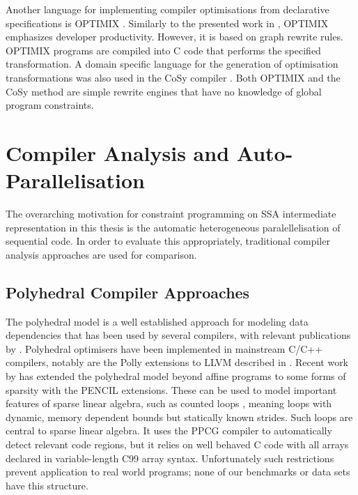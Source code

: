     Another language for implementing compiler optimisations from
    declarative specifications is OPTIMIX \citep{Assmann1996,Assmann98optimix}.
    Similarly to the presented work in , OPTIMIX emphasizes
    developer productivity.
    However, it is based on graph rewrite rules.
    OPTIMIX programs are compiled into C code that performs the specified
    transformation.
    A domain specific language for the generation of optimisation
    transformations was also used in the CoSy compiler \citep{Alt1994}.
    Both OPTIMIX and the CoSy method are simple rewrite engines that have no
    knowledge of global program constraints.

\section{Compiler Analysis and Auto-Parallelisation}

    The overarching motivation for constraint programming on SSA intermediate
    representation in this thesis is the automatic heterogeneous
    paralellelisation of sequential code.
    In order to evaluate this appropriately, traditional compiler analysis
    approaches are used for comparison.

\subsection{Polyhedral Compiler Approaches}

    The polyhedral model is a well established approach for modeling data
    dependencies that has been used by several compilers, with relevant
    publications by \citet{redon1994scheduling, jouvelot1989unified,
    chi1997optimizing, gupta2006simplifying, stock2014framework}.
    Polyhedral optimisers have been implemented in mainstream C/C++ compilers,
    notably are the Polly extensions to LLVM described in
    \cite{Doerfert2015Polly}.
    Recent work by \citet{7429301} has extended the polyhedral model beyond
    affine programs to some forms of sparsity with the PENCIL extensions.
    These can be used to model important features of sparse linear algebra, such
    as counted loops \citep{Zhao:2018:PCF:3178372.3179509}, meaning loops with
    dynamic, memory dependent bounds but statically known strides.
    Such loops are central to sparse linear algebra.
    It uses the PPCG compiler \citep{Verdoolaege:2013:PPC:2400682.2400713} to
    automatically detect relevant code regions, but it relies on well behaved C
    code with all arrays declared in variable-length C99 array syntax.
    Unfortunately such restrictions prevent application to real world programs;
    none of our benchmarks or data sets have this structure.

